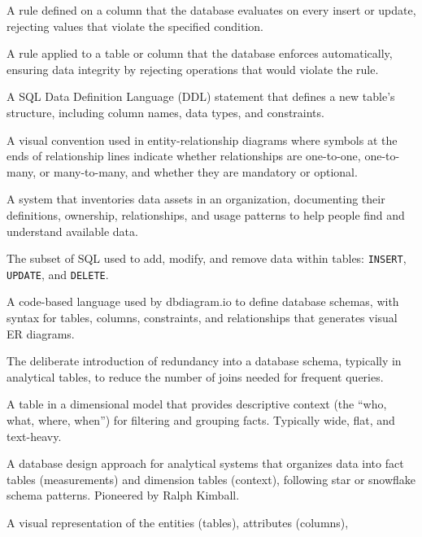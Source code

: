 \documentclass[
  letterpaper,
  DIV=11,
  numbers=noendperiod]{scrreprt}
\providecommand{\tightlist}{%
  \setlength{\itemsep}{0pt}\setlength{\parskip}{0pt}}
\begin{document}
\begin{description}
\tightlist
\item[\textbf{CHECK Constraint}]
A rule defined on a column that the database evaluates on every insert
or update, rejecting values that violate the specified condition.
\item[\textbf{Constraint}]
A rule applied to a table or column that the database enforces
automatically, ensuring data integrity by rejecting operations that
would violate the rule.
\item[\textbf{CREATE TABLE}]
A SQL Data Definition Language (DDL) statement that defines a new
table's structure, including column names, data types, and constraints.
\item[\textbf{Crow's Foot Notation}]
A visual convention used in entity-relationship diagrams where symbols
at the ends of relationship lines indicate whether relationships are
one-to-one, one-to-many, or many-to-many, and whether they are mandatory
or optional.
\item[\textbf{Data Catalog}]
A system that inventories data assets in an organization, documenting
their definitions, ownership, relationships, and usage patterns to help
people find and understand available data.
\item[\textbf{Data Manipulation Language (DML)}]
The subset of SQL used to add, modify, and remove data within tables:
\texttt{INSERT}, \texttt{UPDATE}, and \texttt{DELETE}.
\item[\textbf{DBML (Database Markup Language)}]
A code-based language used by dbdiagram.io to define database schemas,
with syntax for tables, columns, constraints, and relationships that
generates visual ER diagrams.
\item[\textbf{Denormalization}]
The deliberate introduction of redundancy into a database schema,
typically in analytical tables, to reduce the number of joins needed for
frequent queries.
\item[\textbf{Dimension Table}]
A table in a dimensional model that provides descriptive context (the
``who, what, where, when'') for filtering and grouping facts. Typically
wide, flat, and text-heavy.
\item[\textbf{Dimensional Modeling}]
A database design approach for analytical systems that organizes data
into fact tables (measurements) and dimension tables (context),
following star or snowflake schema patterns. Pioneered by Ralph Kimball.
\item[\textbf{Entity-Relationship Diagram (ERD)}]
A visual representation of the entities (tables), attributes (columns),

\end{description}
\end{document}
